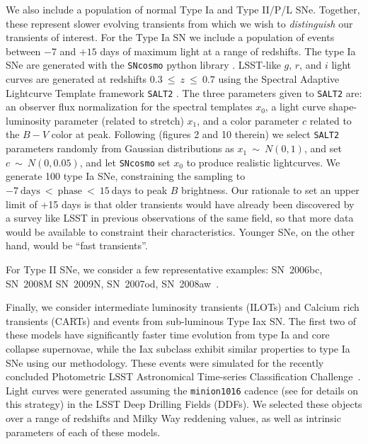 \documentclass[letterpaper,longauthor,trackchanges,twocolumn,onecolappendix,sort&compress]{aastex62}
\newcommand\rahul[1]{\textcolor{blue}{#1}}
\begin{document}
We also include a population of normal Type Ia and Type II/P/L SNe. Together, these represent slower evolving transients from which we wish to \emph{distinguish} our transients of interest. For the Type Ia SN we include a population of events between $-$7 and $+15$ days of maximum light at a range of redshifts. The type Ia SNe are generated with the {\tt SNcosmo} python library \citep{sncosmo}. LSST-like $g$, $r$, and $i$ light curves are generated at redshifts $0.3~\leq~z~\leq~0.7$ using the Spectral Adaptive Lightcurve Template framework {\tt SALT2} \citep[][a light curve fitting model]{salt2}. The three parameters given to {\tt SALT2} are: an observer flux normalization for the spectral templates $x_0$, a light curve shape-luminosity parameter (related to stretch) $x_1$,  and a color parameter $c$ related to the $B - V$ color at peak. Following \citealt{Kessler2010} (figures 2 and 10 therein) we select {\tt SALT2} parameters randomly from Gaussian distributions as $x_1~\sim~N(0,1)$, and set $c~\sim~N(0,0.05)$, and let {\tt SNcosmo} set $x_0$ to produce realistic lightcurves. We generate 100 type Ia SNe, constraining the sampling to $-7~\mathrm{days}~<~\mathrm{phase}~<~15~\mathrm{days}$ to peak $B$ brightness. Our rationale to set an upper limit of +15 days is that older transients would have already been discovered by a survey like LSST in previous observations of the same field, so that more data would be available to constraint their characteristics.  Younger SNe, on the other hand, would be ``fast transients''.

For Type II SNe, we consider a few representative examples: SN~2006bc, SN~2008M SN~2009N, SN~2007od, SN~2008aw~\citep[personal communication]{sncsp}. 


Finally, we consider intermediate luminosity transients (ILOTs) and Calcium rich transients (CARTs) and events from sub-luminous Type Iax SN. The first two of these models have significantly faster time evolution from type Ia and core collapse supernovae, while the Iax subclass exhibit similar properties to type Ia SNe using our methodology. These events were simulated for the recently concluded Photometric LSST Astronomical Time-series Classification Challenge~\citep[PLAsTiCC,][]{plasticc}. Light curves were generated assuming the \texttt{minion1016} cadence (see \citealt{COSEP} for details on this strategy)  in the LSST Deep Drilling Fields (DDFs). We selected these objects over a range of redshifts and Milky Way reddening values, as well as intrinsic parameters of each of these models. 
\end{document}
